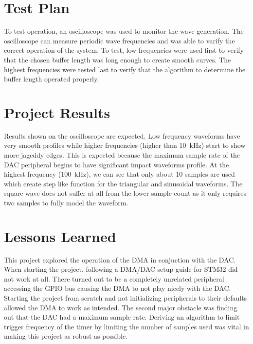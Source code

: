 \documentclass[CMPE]{KGCOEReport}
\begin{document}
    \section*{Test Plan}

    To test operation, an oscilloscope was used to monitor the wave generation.
    The oscilloscope can measure periodic wave frequencies and was able to varify
    the correct operation of the system. To test, low frequencies were used first to
    verify that the chosen buffer length was long enough to create smooth curves.
    The highest frequencies were tested last to verify that the algorithm to determine
    the buffer length operated properly.

    \section*{Project Results}

	Results shown on the oscilloscope are expected. Low frequency waveforms have very
	smooth profiles while higher frequencies (higher than \SI{10}{\kilo\Hz}) start to
	show more jageddy edges. This is expected because the maximum sample rate of the
	DAC peripheral begins to have significant impact waveforms profile. At the highest
	frequency (\SI{100}{\kilo\Hz}), we can see that only about 10 samples are used which
	create step like function for the triangular and sinusoidal waveforms. The square
	wave does not suffer at all from the lower sample count as it only requires two
	samples to fully model the waveform.

    \section*{Lessons Learned}

	This project explored the operation of the DMA in conjuction with the DAC. When
	starting the project, following a DMA/DAC setup guide for STM32 did not work at
	all. There turned out to be a completely unrelated peripheral accessing the GPIO
	bus causing the DMA to not play nicely with the DAC. Starting the project from
	scratch and not initializing peripherals to their defaults allowed the DMA to work
	as intended. The second major obstacle was finding out that the DAC had a maximum
	sample rate. Deriving an algorithm to limit trigger frequency of the timer by limiting
	the number of samples used was vital in making this project as robust as possible.
\end{document}
